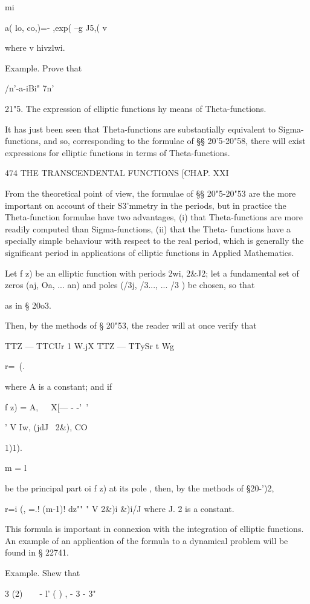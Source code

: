 mi

a( lo, co,)=- ,exp( --g J5,( v

where v hivzlwi.

Example. Prove that

/n'-a-iBi" 7n'\

21"5. The expression of elliptic functions hy means of
Theta-functions.

It has just been seen that Theta-functions are substantially
equivalent to Sigma-functions, and so, corresponding to the formulae
of §§ 20'5-20"58, there will exist expressions for elliptic functions
in terms of Theta-functions.

474 THE TRANSCENDENTAL FUNCTIONS [CHAP. XXI

From the theoretical point of view, the formulae of §§ 20"5-20"53 are
the more important on account of their S3'mmetry in the periods, but
in practice the Theta-function formulae have two advantages, (i) that
Theta-functions are more readily computed than Sigma-functions, (ii)
that the Theta- functions have a specially simple behaviour with
respect to the real period, which is generally the significant period
in applications of elliptic functions in Applied Mathematics.

Let f z) be an elliptic function with periods 2wi, 2\&J2; let a
fundamental set of zeros (aj, Oa, ... an) and poles (/3j, /3..., ...
/3 ) be chosen, so that

as in § 20o3.

Then, by the methods of § 20"53, the reader will at once verify that

TTZ — TTCUr 1 W.jX TTZ — TTySr t Wg

r=\ (.

where A is a constant; and if

f z) = A,\ \ \ X[— - -'~' \ \ %

' V Iw, (jdJ \ 2\&), CO

1)1).

m = l

be the principal part oi f z) at its pole , then, by the methods of
§20-')2,

r=i (, =.! (m-1)! dz"" " V 2\&)i \&)i/J where J. 2 is a constant.

This formula is important in connexion with the integration of
elliptic functions. An example of an application of the formula to a
dynamical problem will be found in § 22741.

Example. Shew that

  3 (2)\ \ \ \ - l' ( ) , - 3 - 3"

